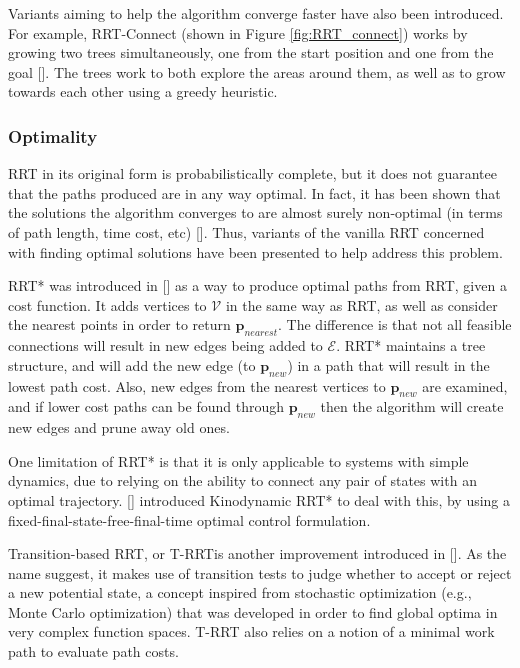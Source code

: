 Variants aiming to help the algorithm converge faster have also been introduced. For example, \gls{RRT}-Connect (shown in Figure \ref{fig:RRT_connect}) works by growing two trees simultaneously, one from the start position and one from the goal [\citeauthor{Kuffner2002}]. The trees work to both explore the areas around them, as well as to grow towards each other using a greedy heuristic.

\subsubsection{Optimality}

\gls{RRT} in its original form is probabilistically complete, but it does not guarantee that the paths produced are in any way optimal. In fact, it has been shown that the solutions the algorithm converges to are almost surely non-optimal (in terms of path length, time cost, etc) [\citeauthor{Karaman2011}]. Thus, variants of the vanilla \gls{RRT} concerned with finding optimal solutions have been presented to help address this problem.

\gls{RRT}* was introduced in [\citeauthor{Karaman2011}] as a way to produce optimal paths from \gls{RRT}, given a cost function. It adds vertices to $\mathcal{V}$ in the same way as \gls{RRT}, as well as consider the nearest points in order to return $\textbf{p}_{nearest}$. The difference is that not all feasible connections will result in new edges being added to $\mathcal{E}$. \gls{RRT}* maintains a tree structure, and will add the new edge (to $\textbf{p}_{new}$) in a path that will result in the lowest path cost. Also, new edges from the nearest vertices to $\textbf{p}_{new}$ are examined, and if lower cost paths can be found through $\textbf{p}_{new}$ then the algorithm will create new edges and prune away old ones.
 
One limitation of \gls{RRT}* is that it is only applicable to systems with simple dynamics, due to relying on the ability to connect any pair of states with an optimal trajectory. [\citeauthor{Webb2012}] introduced Kinodynamic \gls{RRT}* to deal with this, by using a fixed-final-state-free-final-time optimal control formulation.

Transition-based \gls{RRT}, or T-\gls{RRT}is another improvement introduced in [\citeauthor{Jaillet2008}]. As the name suggest, it makes use of transition tests to judge whether to accept or reject a new potential state, a concept inspired from stochastic optimization (e.g., Monte Carlo optimization) that was developed in order to find global optima in very complex function spaces. T-\gls{RRT} also relies on a notion of a minimal work path to evaluate path costs.

